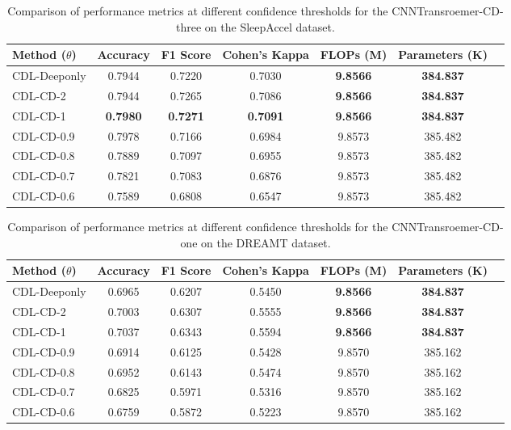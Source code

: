 \begin{table}[ht]
    \centering
    \begin{tabular}{lcccccc}
        \toprule
        Method (\(\theta\)) & Accuracy & F1 Score & Cohen's Kappa & FLOPs (M) & Parameters (K) \\
        \midrule
        CDL-Deeponly & 0.7944 & 0.7220 & 0.7030 & \textbf{9.8566} & \textbf{384.837}\\
        CDL-CD-2 & 0.7944 & 0.7265 & 0.7086 & \textbf{9.8566} & \textbf{384.837}\\
        CDL-CD-1 & \textbf{0.7980} & \textbf{0.7271} & \textbf{0.7091} & \textbf{9.8566} & \textbf{384.837}\\
        CDL-CD-0.9 & 0.7978 & 0.7166 & 0.6984 & 9.8573 & 385.482 \\
        CDL-CD-0.8 & 0.7889 & 0.7097 & 0.6955 & 9.8573 & 385.482 \\
        CDL-CD-0.7 & 0.7821 & 0.7083 & 0.6876 & 9.8573 & 385.482 \\
        CDL-CD-0.6 & 0.7589 & 0.6808 & 0.6547 & 9.8573 & 385.482 \\
        \bottomrule
    \end{tabular}
    \caption{Comparison of performance metrics at different confidence thresholds for the CNNTransroemer-CD-three on the SleepAccel dataset.}
    \label{tab:performance_of_different_confidence}
\end{table}

\begin{table}[ht]
    \centering
    \begin{tabular}{lcccccc}
        \toprule
        Method (\(\theta\)) & Accuracy & F1 Score & Cohen's Kappa & FLOPs (M) & Parameters (K) \\
        \midrule
        CDL-Deeponly & 0.6965 & 0.6207 & 0.5450 & \textbf{9.8566} & \textbf{384.837}\\
        CDL-CD-2 & 0.7003 & 0.6307 & 0.5555 & \textbf{9.8566} & \textbf{384.837}\\
        CDL-CD-1 & 0.7037 & 0.6343 & 0.5594 & \textbf{9.8566} & \textbf{384.837}\\
        CDL-CD-0.9 & 0.6914 & 0.6125 & 0.5428 & 9.8570 & 385.162 \\
        CDL-CD-0.8 & 0.6952 & 0.6143 & 0.5474 & 9.8570 & 385.162 \\
        CDL-CD-0.7 & 0.6825 & 0.5971 & 0.5316 & 9.8570 & 385.162 \\
        CDL-CD-0.6 & 0.6759 & 0.5872 & 0.5223 & 9.8570 & 385.162 \\
        \bottomrule
    \end{tabular}
    \caption{Comparison of performance metrics at different confidence thresholds for the CNNTransroemer-CD-one on the DREAMT dataset.}
    \label{tab:performance_of_different_confidence}
\end{table}

